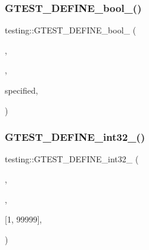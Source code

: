 \subsubsection{\texorpdfstring{G\+T\+E\+S\+T\+\_\+\+D\+E\+F\+I\+N\+E\+\_\+bool\+\_\+()}{GTEST\_DEFINE\_bool\_()}\hspace{0.1cm}{\footnotesize\ttfamily [9/9]}}
{\footnotesize\ttfamily testing\+::\+G\+T\+E\+S\+T\+\_\+\+D\+E\+F\+I\+N\+E\+\_\+bool\+\_\+ (\begin{DoxyParamCaption}\item[{throw\+\_\+on\+\_\+failure}]{,  }\item[{\hyperlink{namespacetesting_1_1internal_a67132cdce23fb71b6c38ee34ef81eb4c}{internal\+::\+Bool\+From\+G\+Test\+Env}(\char`\"{}throw\+\_\+on\+\_\+failure\char`\"{}, false)}]{,  }\item[{\char`\"{}When this flag is}]{specified,  }\item[{a failed assertion will throw an exception \char`\"{} \char`\"{}if exceptions are enabled or exit the program with a non-\/zero code \char`\"{} \char`\"{}otherwise.\char`\"{}}]{ }\end{DoxyParamCaption})}

\mbox{\label{namespacetesting_a9900d8db2670a26999fbc2a9130f7185}} 
\subsubsection{\texorpdfstring{G\+T\+E\+S\+T\+\_\+\+D\+E\+F\+I\+N\+E\+\_\+int32\+\_\+()}{GTEST\_DEFINE\_int32\_()}\hspace{0.1cm}{\footnotesize\ttfamily [1/3]}}
{\footnotesize\ttfamily testing\+::\+G\+T\+E\+S\+T\+\_\+\+D\+E\+F\+I\+N\+E\+\_\+int32\+\_\+ (\begin{DoxyParamCaption}\item[{random\+\_\+seed}]{,  }\item[{\hyperlink{namespacetesting_1_1internal_a0f7e728793f9e6cb0aa2b69eaa468bf3}{internal\+::\+Int32\+From\+G\+Test\+Env}(\char`\"{}random\+\_\+seed\char`\"{}, 0)}]{,  }\item[{\char`\"{}Random number seed to use when shuffling test orders. Must be in range \char`\"{} \char`\"{}}]{\mbox{[}1, 99999\mbox{]},  }\item[{or 0 to use a seed based on the current time.\char`\"{}}]{ }\end{DoxyParamCaption})}



